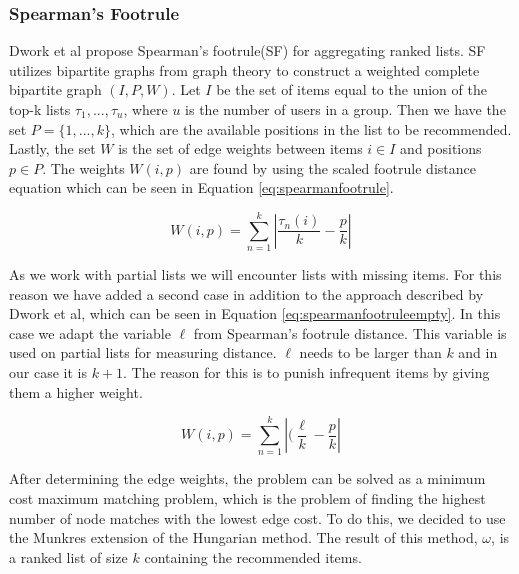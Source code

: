 \subsubsection{Spearman's Footrule}\label{sec:spearmansfootrule}
Dwork et al propose Spearman's footrule(SF) for aggregating ranked lists\citep{rank:aggregation}.
SF utilizes bipartite graphs from graph theory to construct a weighted complete bipartite graph $(I,P,W)$.
Let $I$ be the set of items equal to the union of the top-k lists $\tau_1, ..., \tau_u$, where $u$ is the number of users in a group. Then we have the set $P = \{1,...,k\}$, which are the available positions in the list to be recommended. Lastly, the set $W$ is the set of edge weights between items $i\in I$ and positions $p\in P$. The weights $W(i,p)$ are found by using the scaled footrule distance equation which can be seen in Equation \ref{eq:spearmanfootrule}\cite{rank:aggregation}.
 
\begin{equation}\label{eq:spearmanfootrule}
W(i,p) = \displaystyle\sum_{n=1}^{k} |\frac{\tau_n(i)}{k} - \frac{p}{k}|
\end{equation}

As we work with partial lists we will encounter lists with missing items. For this reason we have added a second case in addition to the approach described by Dwork et al, which can be seen in Equation \ref{eq:spearmanfootruleempty}. In this case we adapt the variable $\ell$ from Spearman's footrule distance. This variable is used on partial lists for measuring distance. $\ell$ needs to be larger than $k$ and in our case it is $k + 1$. The reason for this is to punish infrequent items by giving them a higher weight.

\begin{equation}\label{eq:spearmanfootruleempty}
W(i,p) = \displaystyle\sum_{n=1}^{k} |(\frac{\ell}{k} -\frac{p}{k}|
\end{equation}

After determining the edge weights, the problem can be solved as a minimum cost maximum matching problem, which is the problem of finding the highest number of node matches with the lowest edge cost. To do this, we decided to use the Munkres extension of the Hungarian method\cite{Munkres1957}. The result of this method, $\omega$, is a ranked list of size $k$ containing the recommended items.